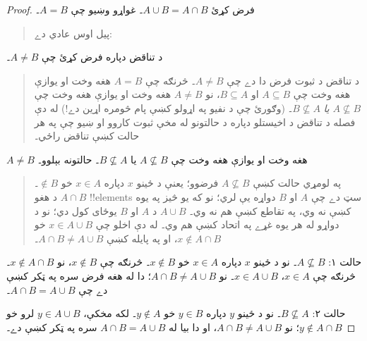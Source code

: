 \documentclass[../../../include/open-logic-section]{subfiles}
\begin{document}
\begin{proof}
  فرض کړئ $A \cup B = A \cap B$۔ غواړو وښيو چې $A = B$۔
  \begin{quote}
    پيل اوس عادي دے:
  \end{quote}
  د تناقض دپاره فرض کړئ چې $A \neq B$۔
  \begin{quote}
    د تناقض د ثبوت فرض دا دے چې $A \neq
    B$۔ څرنګه چې $A = B$ هغه وخت او يوازې هغه وخت
    چې $A \subseteq B$ او $B \subseteq A$، نو
    $A \neq B$ هغه وخت او يوازې هغه وخت چې
    $A \nsubseteq B$ \emph{يا} $B \nsubseteq
    A$۔ (وګورئ چې د نفيو په اړولو کښې پام څومره اړين
    دے!{}) له دې فصله د تناقض د اخيستلو دپاره د حالتونو
    له مخې ثبوت کاروو او ښيو چې په هر حالت کښې تناقض
    راځي۔
  \end{quote}
  $A \neq B$ هغه وخت او يوازې هغه وخت چې
  $A \nsubseteq B$ يا $B \nsubseteq A$۔ حالتونه بېلوو۔
  \begin{quote}
    په لومړي حالت کښې $A \nsubseteq B$ فرضوو؛ يعنې
    د ځينو $x$ دپاره $x \in A$ خو $\notin B$۔ $A \cap B$ د هغو
    !!{element}s سټ دے چې $A$ او $B$ دواړه يې لري؛
    نو که يو څيز په يوه کښې نه وي، په تقاطع کښې هم
    نه وي۔ $A \cup B$ د $A$ او $B$ يوځای کول دي؛
    نو د دواړو له هر يوه غړے په اتحاد کښې هم وي۔
    له دې اخلو چې $x \in A \cup B$ خو
    $x \notin A \cap
    B$، او په پايله کښې $A \cap B \neq A \cup B$۔
  \end{quote}

  حالت ۱: $A \nsubseteq B$۔ نو د ځينو $x$ دپاره
  $x \in A$ خو $x \notin
  B$۔ څرنګه چې $x \notin B$، نو
  $x \notin A \cap B$۔ څرنګه چې $x \in A$،
  $x \in A \cup B$۔ نو $A \cap B \neq A \cup B$؛
  دا له هغه فرض سره په ټکر کښې دے چې
  $A \cap B = A \cup B$۔

  حالت ۲: $B \nsubseteq A$۔ نو د ځينو $y$ دپاره
  $y \in B$ خو $y \notin
  A$۔ لکه مخکې، $y \in A \cup B$ لرو خو
  $y \notin A \cap B$؛ نو $A \cap B \neq A \cup B$،
  او دا بيا له $A \cap B = A \cup
  B$ سره په ټکر کښې دے۔
\end{proof}
\end{document}
